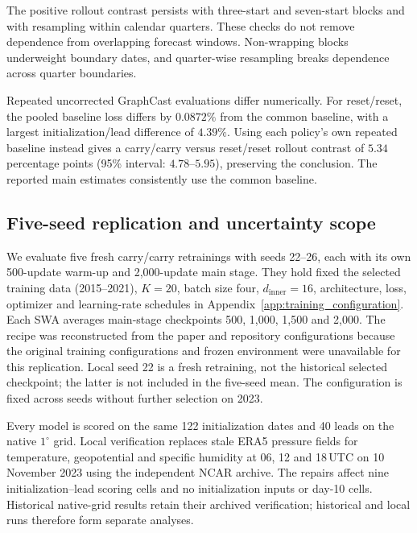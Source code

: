 \documentclass{article}
\newcommand{\vfourchange}[1]{{\color{blue}#1}}
\begin{document}
\vfourchange{The positive rollout contrast persists with three-start and seven-start blocks and with resampling within calendar quarters. These checks do not remove dependence from overlapping forecast windows. Non-wrapping blocks underweight boundary dates, and quarter-wise resampling breaks dependence across quarter boundaries.}

\vfourchange{Repeated uncorrected GraphCast evaluations differ numerically. For reset/reset, the pooled baseline loss differs by $0.0872\%$ from the common baseline, with a largest initialization/lead difference of $4.39\%$. Using each policy's own repeated baseline instead gives a carry/carry versus reset/reset rollout contrast of $5.34$ percentage points (95\% interval: $4.78$--$5.95$), preserving the conclusion. The reported main estimates consistently use the common baseline.}



\subsection{\vfourchange{Five-seed replication and uncertainty scope}}
\label{app:seed_replication}

\vfourchange{We evaluate five fresh carry/carry retrainings with seeds 22--26, each with its own 500-update warm-up and 2,000-update main stage. They hold fixed the selected training data (2015--2021), $K=20$, batch size four, $d_{\mathrm{inner}}=16$, architecture, loss, optimizer and learning-rate schedules in Appendix~\ref{app:training_configuration}. Each SWA averages main-stage checkpoints 500, 1,000, 1,500 and 2,000. The recipe was reconstructed from the paper and repository configurations because the original training configurations and frozen environment were unavailable for this replication. Local seed 22 is a fresh retraining, not the historical selected checkpoint; the latter is not included in the five-seed mean. The configuration is fixed across seeds without further selection on 2023.}

\vfourchange{Every model is scored on the same 122 initialization dates and 40 leads on the native $1^\circ$ grid. Local verification replaces stale ERA5 pressure fields for temperature, geopotential and specific humidity at 06, 12 and 18\,UTC on 10 November 2023 using the independent NCAR archive. The repairs affect nine initialization--lead scoring cells and no initialization inputs or day-10 cells. Historical native-grid results retain their archived verification; historical and local runs therefore form separate analyses.}
\end{document}
